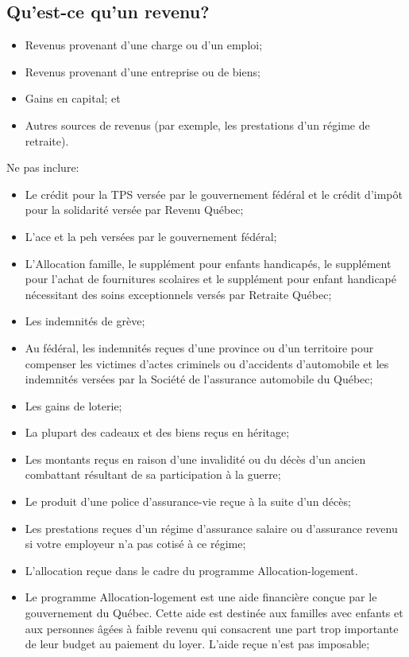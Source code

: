 \subsection{Qu'est-ce qu'un revenu?}
\caqc
\begin{itemize}
	\item Revenus provenant d'une charge ou d'un emploi;
	\item Revenus provenant d'une entreprise ou de biens;
	\item Gains en capital; et
	\item Autres sources de revenus (par exemple, les prestations d'un régime de retraite).
\end{itemize}

Ne pas inclure:
\caqc
\begin{itemize}
	\item Le crédit pour la TPS versée par le gouvernement fédéral et le crédit d'impôt pour la solidarité versée par Revenu Québec;
	\item L'\acrfull{ace} et la \acrfull{peh} versées par le gouvernement fédéral;
	\item L'Allocation famille, le supplément pour enfants handicapés, le supplément pour l'achat de fournitures scolaires et le supplément pour enfant handicapé nécessitant des soins exceptionnels versés par Retraite Québec;
	\item Les indemnités de grève;
	\item Au fédéral, les indemnités reçues d'une province ou d'un territoire pour compenser les victimes d'actes criminels ou d'accidents d'automobile et les indemnités versées par la Société de l'assurance automobile du Québec;
	\item Les gains de loterie;
	\item La plupart des cadeaux et des biens reçus en héritage;
	\item Les montants reçus en raison d'une invalidité ou du décès d'un ancien combattant résultant de sa participation à la guerre;
	\item Le produit d'une police d'assurance-vie reçue à la suite d'un décès;
	\item Les prestations reçues d'un régime d'assurance salaire ou d'assurance revenu si votre employeur n'a pas cotisé à ce régime;
	\item L'allocation reçue dans le cadre du programme Allocation-logement.
	\item Le programme Allocation-logement est une aide financière conçue par le gouvernement du Québec. Cette aide est destinée aux familles avec enfants et aux personnes âgées à faible revenu qui consacrent une part trop importante de leur budget au paiement du loyer. L'aide reçue n'est pas imposable;

\end{itemize}
